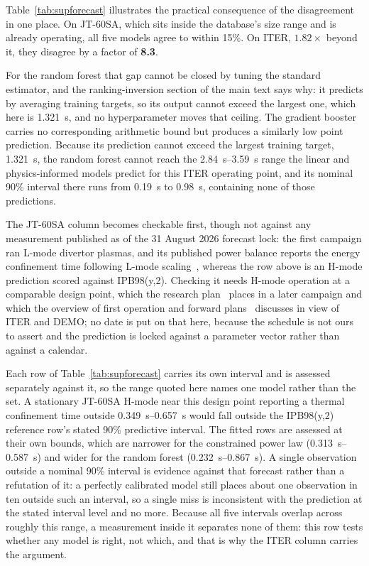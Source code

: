 \documentclass[12pt,letterpaper]{article}
\begin{document}
Table~\ref{tab:supforecast} illustrates the practical consequence of the
disagreement in one place. On JT-60SA,
which sits inside the database's size range and is already operating, all five
models agree to within 15\%. On ITER, $1.82\times$ beyond it, they disagree by a
factor of \textbf{8.3}.

For the random forest that gap cannot be closed by tuning the standard
estimator, and the ranking-inversion section of the main text says why: it predicts by averaging
training targets, so its output cannot exceed the largest one, which here is
\SI{1.321}{\second}, and no hyperparameter moves that ceiling. The gradient
booster carries no corresponding arithmetic bound but produces a similarly low
point prediction. Because its prediction cannot exceed the largest training
target, \SI{1.321}{\second}, the random forest cannot reach the
\SIrange{2.84}{3.59}{\second} range the linear and physics-informed models
predict for this ITER operating point, and its nominal 90\% interval there runs
from \SI{0.19}{\second} to \SI{0.98}{\second}, containing none of those
predictions.

The JT-60SA column becomes checkable first, though not against any measurement
published as of the 31 August 2026 forecast lock: the first campaign ran L-mode
divertor plasmas, and its published power balance reports the energy confinement
time following L-mode scaling~\cite{jt60saop1}, whereas the row above is an
H-mode prediction scored against IPB98(y,2). Checking it needs H-mode operation
at a comparable design point, which the research plan~\cite{jt60saplan} places
in a later campaign and which the overview of first operation and forward
plans~\cite{jt60saop2} discusses in view of ITER and DEMO; no date is put on that here, because the
schedule is not ours to assert and the prediction is locked against a parameter
vector rather than against a calendar.

Each row of Table~\ref{tab:supforecast} carries its own interval and is assessed
separately against it, so the range quoted here names one model rather than the
set. A stationary JT-60SA H-mode near this design point reporting a thermal
confinement time outside \SIrange{0.349}{0.657}{\second} would fall outside the
IPB98(y,2) reference row's stated 90\% predictive interval. The fitted rows are
assessed at their own bounds, which are narrower for the constrained power law
(\SIrange{0.313}{0.587}{\second}) and wider for the random forest
(\SIrange{0.232}{0.867}{\second}). A single observation outside a nominal 90\%
interval is evidence against that forecast rather than a refutation of it: a
perfectly calibrated model still places about one observation in ten outside
such an interval, so a single miss is inconsistent with the prediction at the
stated interval level and no more. Because all five intervals overlap across
roughly this range, a measurement inside it separates none of them: this row
tests whether any model is right, not which, and that is why the ITER column
carries the argument.
\end{document}
